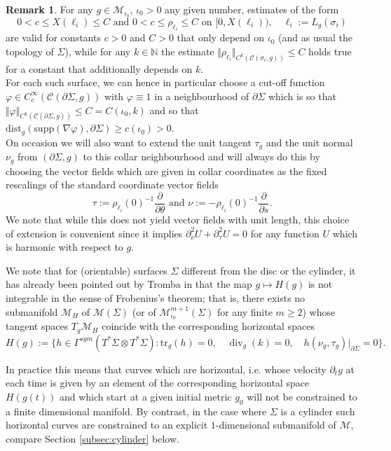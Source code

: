 \documentclass[10pt,reqno]{amsart}
\theoremstyle{plain}
\theoremstyle{definition}
\newcommand{\pnu}{\partial_\nu}
\newtheorem{rmk}[lemma]{Remark}
\numberwithin{equation}{section}
\newcommand{\si}{\sigma}
\newcommand{\Si}{\Sigma}
\newcommand{\N}{\ensuremath{{\mathbb N}}}
\newcommand{\norm}[1]{\Vert#1\Vert}
\DeclareMathOperator{\Div}{div}
\newcommand{\beq}{\begin{equation}}
\newcommand{\eeq}{\end{equation}}
\newcommand{\pt}{\partial_t}
\newcommand{\na}{\nabla}
\newcommand{\dist}{\text{dist}}
\newcommand{\Col}{\mathcal C}
\newcommand{\pSi}{{\partial \Sigma}}
\newcommand{\MM}{\mathcal{M}} %
\newcommand{\supp}{\text{supp}}
\newcommand{\ptau}{\partial_\tau}
\newcommand{\MMiota}{\MM_{\iota_0}}
\begin{document}
\begin{rmk}\label{collar:uniform} 
    For any $g\in \MMiota$, $\iota_0>0$ any given number, estimates of the form 
    \beq
        0<c\leq X(\ell_i)\leq C \text{ and } 0<c \leq \rho_{\ell_i}\leq C \text{ on } [0,X(\ell_i)), \quad  \ell_i:= L_g(\si_i)
    \eeq
    are valid for constants $c>0$ and $C>0$ that only depend on $\iota_0$ (and as usual the topology of $\Si$), while for any $k\in \N$ the estimate $\norm{\rho_{\ell_i}}_{C^k(\Col(\si_i,g))} \leq C$ holds true for a constant that additionally depends on $k$. 
    \\
    For each such surface, we can hence in particular choose a cut-off function $\varphi\in C_c^\infty(\Col(\pSi,g))$ with $\varphi\equiv 1$ in a neighbourhood of $\pSi$ which is so that $\norm{\varphi}_{C^k(\Col(\pSi,g))}\leq C=C(\iota_0,k)$ and so that $\dist_g(\supp(\na \varphi), \pSi)\geq c(\iota_0)>0$. 
    \\
    On occasion we will also want to extend the unit tangent $\tau_g$ and the unit normal $\nu_g$ from $(\pSi, g)$ to this collar neighbourhood and will always do this by choosing the vector fields which are given in collar coordinates as the fixed rescalings of the standard coordinate vector fields
    \beq\label{def:extension-tau-nu}
        \tau:=\rho_{\ell_i}(0)^{-1} \frac{\partial}{\partial \theta} \text{ and } \nu:= - \rho_{\ell_i}(0)^{-1} \frac{\partial}{\partial s}.
    \eeq
    We note that while this does not yield vector fields with unit length, this choice of extension is convenient since it implies $\pnu^2U+\ptau^2 U=0$ for any function $U$ which is harmonic with respect to $g$.  
\end{rmk}

We note that for (orientable) surfaces $\Si$ different from the disc or the cylinder, it has already been pointed out by Tromba in \cite{Tromba} that the map $g\mapsto H(g)$ is not integrable in the sense of Frobenius's theorem; that is, there exists no submanifold $\MM_H$ of $\MM(\Si)$ (or of $\MMiota^{m+1}(\Si)$ for any finite $m\ge 2$) whose tangent spaces $T_g\MM_H$ coincide with the corresponding horizontal spaces 
\beq\label{def:H(g)} 
    H(g):= \{h\in \Gamma^{sym}(T^*\Si\otimes T^*\Si): \text{tr}_g(h)=0, \quad \Div_g(k)=0, \quad h(\nu_g,\tau_g)\vert_\pSi=0\}.
\eeq

In practice this means that curves which are horizontal, i.e. whose velocity $\pt g$ at each time is given by an element of the corresponding horizontal space $H(g(t))$ and which start at a given initial metric $g_0$ will not be constrained to a finite dimensional manifold. By contrast, in the case where  $\Si$ is a cylinder such horizontal curves are constrained to an explicit $1$-dimensional submanifold of $\MM$, compare Section \ref{subsec:cylinder} below. 
\end{document}
